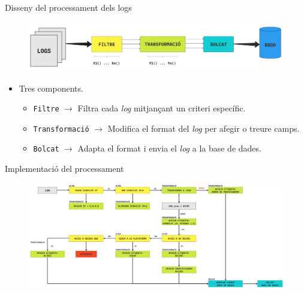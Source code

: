 \begin{frame}{Disseny del processament dels logs}

    \begin{figure}
        \includegraphics[width=\textwidth]{figures/log-processing}\label{fig:log-processing}
    \end{figure}

    \begin{itemize}[<+- | alert@+>]
        \item Tres components.
        \begin{itemize}[<+- | alert@+>]
            \item \texttt{Filtre} \(\rightarrow\) Filtra cada \textit{log} mitjançant un criteri específic.
            \item \texttt{Transformació} \(\rightarrow\) Modifica el format del \textit{log} per afegir o treure camps.
            \item \texttt{Bolcat} \(\rightarrow\) Adapta el format i envia el \textit{log} a la base de dades.
        \end{itemize}
    \end{itemize}
\end{frame}


\begin{frame}{Implementació del processament}
    \begin{figure}
        \includegraphics[width=1\textwidth]{figures/log-processing-workflow}\label{fig:log-processing-workflow}
    \end{figure}
\end{frame}


